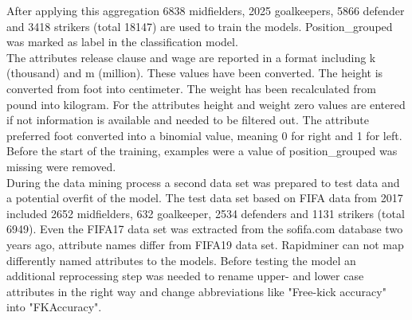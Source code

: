 After applying this aggregation 6838 midfielders, 2025 goalkeepers, 5866 defender and 3418 strikers (total 18147) are used to train the models. Position\_grouped was marked as label in the classification model.\\
The attributes release clause and wage are reported in a format including k (thousand) and m (million). These values have been converted. The height is converted from foot into centimeter. The weight has been recalculated from pound into kilogram.  For the attributes height and weight zero values are entered if not information is available and needed to be filtered out. The attribute preferred foot converted into a binomial value, meaning 0 for right and 1 for left. %
Before the start of the training, examples were a value of position\_grouped was missing were removed.\\
During the data mining process a second data set was prepared to test data and a potential overfit of the model. The test data set based on FIFA data from 2017 included 2652 midfielders, 632 goalkeeper, 2534 defenders and 1131 strikers (total 6949).
Even the FIFA17 data set was extracted from the sofifa.com database two years ago, attribute names differ from FIFA19 data set. Rapidminer can not map differently named attributes to the models. Before testing the model an additional reprocessing step was needed to rename upper- and lower case attributes in the right way and change abbreviations like "Free-kick accuracy" into "FKAccuracy".